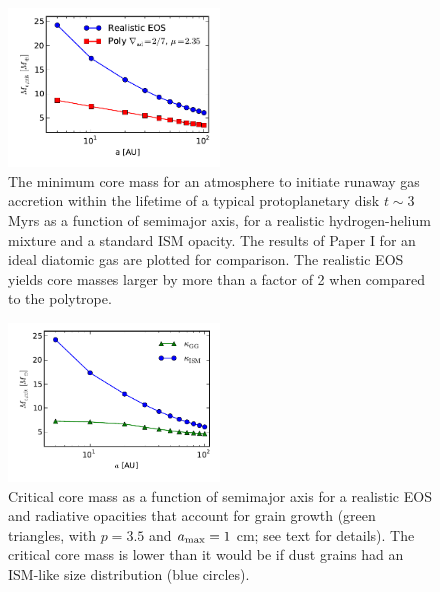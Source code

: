 \documentclass[apj]{emulateapj}
\begin{document}
\begin{figure}[h!]
\centering
\includegraphics[width=0.5\textwidth]{../../figs/ModelAtmospheres/RadSelfGravRealEOS/PaperFigs/Mc_vs_a_poly_real_paper.pdf}
\caption{The minimum core mass for an atmosphere to initiate runaway gas accretion within the lifetime of a typical protoplanetary disk $t \sim 3$ Myrs as a function of semimajor axis, for a realistic hydrogen-helium mixture and a standard ISM opacity. The results of Paper I for an ideal diatomic gas are plotted for comparison. The realistic EOS yields core masses larger by more than a factor of 2 when compared to the polytrope.}
\label{fig:Mvsaplot}
\end{figure}


\begin{figure}[h!]
\centering
\includegraphics[width=0.5\textwidth]{../../figs/ModelAtmospheres/RadSelfGravRealEOS/PaperFigs/Mcrit_vs_a_gg.pdf}
\caption{Critical core mass as a function of semimajor axis for a realistic EOS and radiative opacities that account for grain growth (green triangles, with $p=3.5$ and $a_{\rm max}=1$ cm; see text for details). The critical core mass is lower than it would be if dust grains had an ISM-like size distribution (blue circles).}
\label{fig:Mcritvsagg}
\end{figure}
\end{document}
